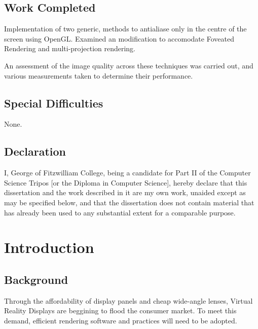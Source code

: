 \documentclass[12pt,a4paper,twoside,openright]{report}
\begin{document}
\section*{Work Completed}

Implementation of two generic, methods to antialiase only in the centre of the screen using OpenGL. Examined an modification to accomodate Foveated Rendering and multi-projection rendering.

An assessment of the image quality across these techniques was carried out, and various measurements taken to determine their performance.   

\section*{Special Difficulties}

None.
 
\newpage
\section*{Declaration}

I, George of Fitzwilliam College, being a candidate for Part II of the Computer
Science Tripos [or the Diploma in Computer Science], hereby declare
that this dissertation and the work described in it are my own work,
unaided except as may be specified below, and that the dissertation
does not contain material that has already been used to any substantial
extent for a comparable purpose.

\bigskip
{}

\medskip
{}

\tableofcontents

\listoffigures


\pagestyle{headings}

\chapter{Introduction}

\section{Background}

Through the affordability of display panels and cheap wide-angle lenses, Virtual Reality Displays are beggining to flood the consumer market. To meet this demand, efficient rendering software and practices will need to be adopted.
\end{document}
